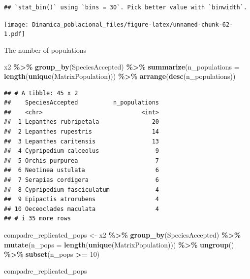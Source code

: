\documentclass[
]{book}
\newenvironment{Shaded}{\begin{snugshade}}{\end{snugshade}}
\newcommand{\AttributeTok}[1]{\textcolor[rgb]{0.13,0.29,0.53}{#1}}
\newcommand{\DecValTok}[1]{\textcolor[rgb]{0.00,0.00,0.81}{#1}}
\newcommand{\FunctionTok}[1]{\textcolor[rgb]{0.13,0.29,0.53}{\textbf{#1}}}
\newcommand{\NormalTok}[1]{#1}
\newcommand{\OtherTok}[1]{\textcolor[rgb]{0.56,0.35,0.01}{#1}}
\newcommand{\SpecialCharTok}[1]{\textcolor[rgb]{0.81,0.36,0.00}{\textbf{#1}}}
\theoremstyle{definition}
\theoremstyle{definition}
\theoremstyle{definition}
\theoremstyle{definition}
\theoremstyle{remark}
\begin{document}
\begin{verbatim}
## `stat_bin()` using `bins = 30`. Pick better value with `binwidth`.
\end{verbatim}

\texttt{[image: Dinamica\_poblacional\_files/figure-latex/unnamed-chunk-62-1.pdf]}

The number of populations

\begin{Shaded}
\begin{Highlighting}[]
\NormalTok{x2 }\SpecialCharTok{\%\textgreater{}\%} 
  \FunctionTok{group\_by}\NormalTok{(SpeciesAccepted) }\SpecialCharTok{\%\textgreater{}\%} 
  \FunctionTok{summarize}\NormalTok{(}\AttributeTok{n\_populations =} \FunctionTok{length}\NormalTok{(}\FunctionTok{unique}\NormalTok{(MatrixPopulation))) }\SpecialCharTok{\%\textgreater{}\%} 
  \FunctionTok{arrange}\NormalTok{(}\FunctionTok{desc}\NormalTok{(n\_populations))}
\end{Highlighting}
\end{Shaded}

\begin{verbatim}
## # A tibble: 45 x 2
##    SpeciesAccepted          n_populations
##    <chr>                            <int>
##  1 Lepanthes rubripetala               20
##  2 Lepanthes rupestris                 14
##  3 Lepanthes caritensis                13
##  4 Cypripedium calceolus                9
##  5 Orchis purpurea                      7
##  6 Neotinea ustulata                    6
##  7 Serapias cordigera                   6
##  8 Cypripedium fasciculatum             4
##  9 Epipactis atrorubens                 4
## 10 Oeceoclades maculata                 4
## # i 35 more rows
\end{verbatim}

\begin{Shaded}
\begin{Highlighting}[]
\NormalTok{compadre\_replicated\_pops }\OtherTok{\textless{}{-}}\NormalTok{ x2 }\SpecialCharTok{\%\textgreater{}\%} 
  \FunctionTok{group\_by}\NormalTok{(SpeciesAccepted) }\SpecialCharTok{\%\textgreater{}\%} 
  \FunctionTok{mutate}\NormalTok{(}\AttributeTok{n\_pops =} \FunctionTok{length}\NormalTok{(}\FunctionTok{unique}\NormalTok{(MatrixPopulation))) }\SpecialCharTok{\%\textgreater{}\%} 
  \FunctionTok{ungroup}\NormalTok{() }\SpecialCharTok{\%\textgreater{}\%}
  \FunctionTok{subset}\NormalTok{(n\_pops }\SpecialCharTok{\textgreater{}=} \DecValTok{10}\NormalTok{)}

\NormalTok{compadre\_replicated\_pops}
\end{Highlighting}
\end{Shaded}
\end{document}
